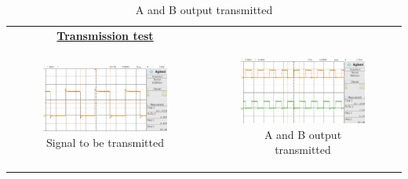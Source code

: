 \vspace{-1mm}
\begin{table}[H]
    \centering
    \begin{tabular}{|c|c|}
    \hline
    \textbf{\underline{Transmission test}}&\\
    \vspace{-5mm}
      \begin{minipage}[b]{0.45\textwidth}
        \begin{figure}[H]
            \centering
            \includegraphics[width=1\textwidth]{max_trans_signal.png}
            \vspace{-8mm}
            \caption{\small{Signal to be transmitted}}
        \end{figure}
      \end{minipage}
       &   
      \begin{minipage}[b]{0.45\textwidth}
        \begin{figure}[H]
            \centering
            \includegraphics[width=1\textwidth]{max_trans_outputAB.png}
            \vspace{-8mm}
            \caption{\small{A and B output transmitted}}
        \end{figure}

\end{minipage}
\end{tabular}
\end{table}
